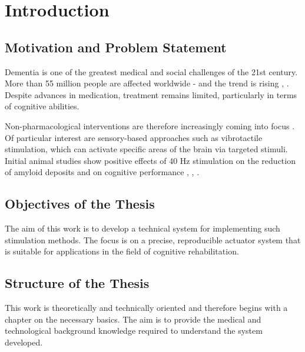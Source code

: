 \chapter[Introduction]{Introduction}

\section{Motivation and Problem Statement}
Dementia is one of the greatest medical and social challenges of the 21st century. More than 55 million people are affected worldwide - and the trend is rising \cite{Association.2025}, \cite{WorldHealthOrganization.2021}. Despite advances in medication, treatment remains limited, particularly in terms of cognitive abilities.

Non-pharmacological interventions are therefore increasingly coming into focus \cite{Zucchella.2018}. Of particular interest are sensory-based approaches such as vibrotactile stimulation, which can activate specific areas of the brain via targeted stimuli. Initial animal studies show positive effects of 40 Hz stimulation on the reduction of amyloid deposits and on cognitive performance \cite{Mably.2018}, \cite{Iaccarino.2016}, \cite{Martorell.2019}.

\section{Objectives of the Thesis}
The aim of this work is to develop a technical system for implementing such stimulation methods. The focus is on a precise, reproducible actuator system that is suitable for applications in the field of cognitive rehabilitation.

\section{Structure of the Thesis}
This work is theoretically and technically oriented and therefore begins with a chapter on the necessary basics. The aim is to provide the medical and technological background knowledge required to understand the system developed.
